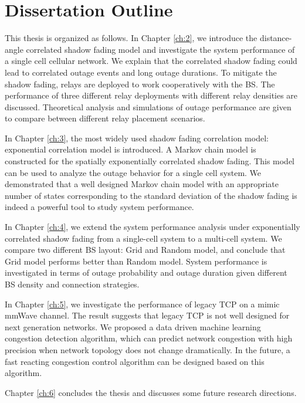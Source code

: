 \section{Dissertation Outline}
\par This thesis is organized as follows. In Chapter \ref{ch:2}, we introduce the distance-angle correlated shadow fading model and investigate the system performance of a single cell cellular network. We explain that the correlated shadow fading could lead to correlated outage events and long outage durations. To mitigate the shadow fading, relays are deployed to work cooperatively with the BS. The performance of three different relay deployments with different relay densities are discussed. Theoretical analysis and simulations of outage performance are given to compare between different relay placement scenarios. 
\par In Chapter \ref{ch:3}, the most widely used shadow fading correlation model: exponential correlation model is introduced. A Markov chain model is constructed for the spatially exponentially correlated shadow fading. This model can be used to analyze the outage behavior for a single cell system. We demonstrated that a well designed Markov chain model with an appropriate number of states corresponding to the standard deviation of the shadow fading is indeed a powerful tool to study system performance.
\par In Chapter \ref{ch:4}, we extend the system performance analysis under exponentially correlated shadow fading from a single-cell system to a multi-cell system. We compare two different BS layout: Grid and Random model, and conclude that Grid model performs better than Random model. System performance is investigated in terms of outage probability and outage duration given different BS density and connection strategies. 
\par In Chapter \ref{ch:5}, we investigate the performance of legacy TCP on a mimic mmWave channel. The result suggests that legacy TCP is not well designed for next generation networks. We proposed a data driven machine learning congestion detection algorithm, which can predict network congestion with high precision when network topology does not change dramatically. In the future, a fast reacting congestion control algorithm can be designed based on this algorithm.
\par Chapter \ref{ch:6} concludes the thesis and discusses some future research directions.








